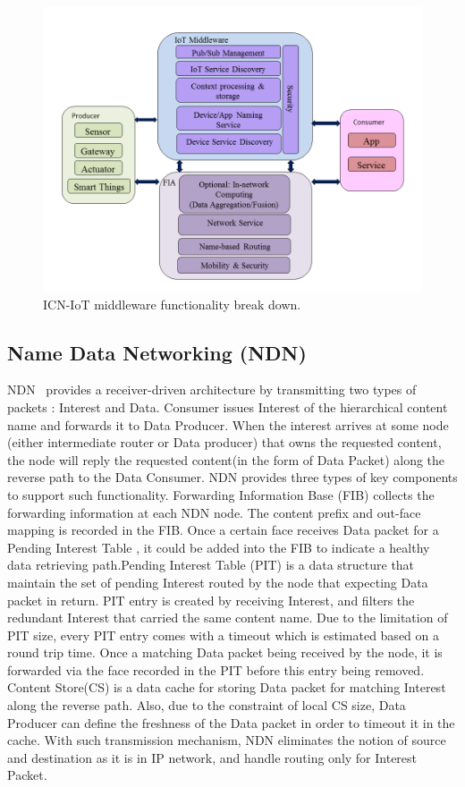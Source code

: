 \begin{figure}
\centering
\includegraphics[width=\columnwidth]{figure/middleware_architecture.png}
\caption{\label{fig:mid_arch} ICN-IoT middleware functionality break down.}
\end{figure}
\subsection{Name Data Networking (NDN)}
NDN~\cite{zhang2014named} provides a receiver-driven architecture by transmitting two types of packets : Interest and Data. Consumer issues Interest of the hierarchical content name and forwards it to Data Producer. When the interest arrives at some node (either intermediate router or Data producer) that owns the requested content, the node will reply the requested content(in the form of Data Packet) along the reverse path to the Data Consumer. NDN provides three types of key components to support such functionality. Forwarding Information Base (FIB) collects the forwarding information at each NDN node. The content prefix and out-face mapping is recorded in the FIB. Once a certain face receives Data packet for a Pending Interest Table , it could be added into the FIB to indicate a healthy data retrieving path.Pending Interest Table (PIT) is a data structure that maintain the set of pending Interest routed by the node that expecting Data packet in return. PIT entry is created by receiving Interest, and filters the redundant Interest that carried the same content name. Due to the limitation of PIT size, every PIT entry comes with a timeout which is estimated based on a round trip time. Once a matching Data packet being received by the node, it is forwarded via the face recorded in the PIT before this entry being removed. Content Store(CS) is a data cache for storing Data packet for matching Interest along the reverse path. Also, due to the constraint of local CS size, Data Producer can define the freshness of the Data packet in order to timeout it in the cache. With such transmission mechanism, NDN eliminates the notion of source and destination as it is in IP network, and handle routing only for Interest Packet.

